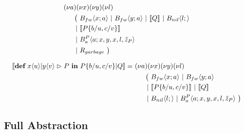 
\begin{align*}
  &\anew{a}{\anew{x}{\anew{y}{\anew{l}{ \\
    &\hspace{0.5cm}
    \begin{aligned}[t]
      \big(\ &\ains{B_{fw}}{x}{a}
      \apar   \ains{B_{fw}}{y}{a}
      \apar   \encMJtoAP{Q}
      \apar   \ains{B_{nil}}{l}{}
      \\
      \apar  &\encMJtoAP{P\substitution{\subst{b}{u},\subst{c}{v}}}
      \\
      \apar  &\ains{B_a^P}{a}{x, y, x, l,\tilde{z}_P}
      \\
      \apar  &R_{garbage}
      \ \big)
    \end{aligned}
  }}}}
\end{align*}


\begin{align*}
  \encMJtoAP{\jdef{\jrct{\jrcv{x}{u} \jpat \jrcv{y}{v}}{P}}{P\substitution{\subst{b}{u},\subst{c}{v}} \jpar Q}}
  =\ &\anew{a}{\anew{x}{\anew{y}{\anew{l}{ \\
      &\hspace{0.5cm}
      \begin{aligned}[t]
        \big(\ &\ains{B_{fw}}{x}{a}
        \apar   \ains{B_{fw}}{y}{a} \\
        \apar  &\encMJtoAP{P\substitution{\subst{b}{u},\subst{c}{v}}} \apar \encMJtoAP{Q} \\
        \apar  &\ains{B_{nil}}{l}{}
        \apar   \ains{B_a^P}{a}{x, y, x, l, \tilde{z}_P}
        \ \big)
      \end{aligned}
    }}}}
\end{align*}



\subsection{Full Abstraction}

